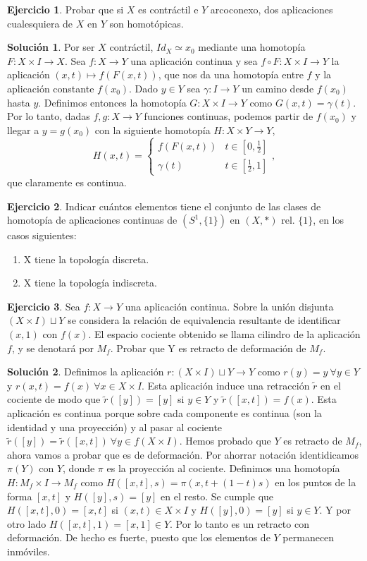 \documentclass{article}
\theoremstyle{plain}
\theoremstyle{definition}
\newtheorem{exercise}{Ejercicio}
\newtheorem*{sol*}{Solución}
\begin{document}
\newpage
\begin{exercise}
Probar que si $X$ es contráctil e $Y$ arcoconexo, dos aplicaciones cualesquiera de $X$ en $Y$ son homotópicas.
\end{exercise}
\begin{sol*}
Por ser $X$ contráctil, $Id_X\simeq x_0$ mediante una homotopía $F:X\times I\to X$. Sea $f:X\to Y$ una aplicación continua y sea $f\circ F: X\times I\to Y$ la aplicación $(x,t)\mapsto f(F(x,t))$, que nos da una homotopía entre $f$ y la aplicación constante $f(x_0)$. Dado $y\in Y$ sea $\gamma: I\to Y$ un camino desde $f(x_0)$ hasta $y$. Definimos entonces la homotopía $G:X\times I\to Y$ como $G(x,t)=\gamma(t)$. Por lo tanto, dadas $f,g:X\to Y$ funciones continuas, podemos partir de $f(x_0)$ y llegar a $y=g(x_0)$ con la siguiente homotopía $H:X\times Y\to Y$,
$$
H(x,t)=\begin{cases}
f(F(x,t)) & t\in[0,\frac{1}{2}]\\
\gamma(t) & t\in[\frac{1}{2},1]
\end{cases},
$$
que claramente es continua.
\end{sol*}
\newpage
\begin{exercise}
Indicar cuántos elementos tiene el conjunto de las clases de homotopía de aplicaciones continuas de $(S^1,\{1\})$ en $(X,*)$ rel. $\{1\}$, en los casos siguientes:
\begin{enumerate}
\item X tiene la topología discreta.
\item X tiene la topología indiscreta.
\end{enumerate}
\end{exercise}
\newpage
\begin{exercise}
Sea $f:X\to Y$ una aplicación continua. Sobre la unión disjunta $(X\times I)\sqcup Y$ se considera la relación de equivalencia resultante de identificar $(x,1)$ con $f(x)$. El espacio cociente obtenido se llama cilindro de la aplicación $f$, y se denotará por $M_f$. Probar que Y es retracto de deformación de $M_f$.
\end{exercise}
\begin{sol*}
Definimos la aplicación $r:(X\times I)\sqcup Y\to Y$ como $r(y)=y\ \forall y\in Y$ y $r(x,t)=f(x)\ \forall x\in X\times I$. Esta aplicación induce una retracción $\tilde{r}$ en el cociente de modo que $\tilde{r}([y])=[y]$ si $y\in Y$ y $\tilde{r}([x,t])=f(x)$. Esta aplicación es continua porque sobre cada componente es continua (son la identidad y una proyección) y al pasar al cociente $\tilde{r}([y])=\tilde{r}([x,t])\ \forall y\in f(X\times I)$. Hemos probado que $Y$ es retracto de $M_f$, ahora vamos a probar que es de deformación. Por ahorrar notación identidicamos $\pi(Y)$ con $Y$, donde $\pi$ es la proyección al cociente. Definimos una homotopía $H:M_f\times I \to M_f$ como $H([x,t],s)=\pi(x,t+(1-t)s)$ en los puntos de la forma $[x,t]$ y $H([y],s)=[y]$ en el resto. Se cumple que $H([x,t],0)=[x,t]$ si $(x,t)\in X\times I$ y $H([y],0)=[y]$ si $y\in Y$. Y por otro lado $H([x,t],1)=[x,1]\in Y$. Por lo tanto es un retracto con deformación. De hecho es fuerte, puesto que los elementos de $Y$ permanecen inmóviles.

\end{sol*}
\end{document}
